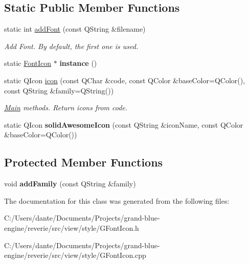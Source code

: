 \subsection*{Static Public Member Functions}
\begin{DoxyCompactItemize}
\item 
\mbox{\label{classrev_1_1_font_icon_aa422a4dac1897e70632f4af132a2d5d1}} 
static int \mbox{\hyperlink{classrev_1_1_font_icon_aa422a4dac1897e70632f4af132a2d5d1}{add\+Font}} (const Q\+String \&filename)
\begin{DoxyCompactList}\small\item\em Add Font. By default, the first one is used. \end{DoxyCompactList}\item 
\mbox{\label{classrev_1_1_font_icon_aa67f5c196bd46217b331924cfb3020da}} 
static \mbox{\hyperlink{classrev_1_1_font_icon}{Font\+Icon}} $\ast$ {\bfseries instance} ()
\item 
\mbox{\label{classrev_1_1_font_icon_a77fbe9901d4d1ccf5c34cd28d2b9e737}} 
static Q\+Icon \mbox{\hyperlink{classrev_1_1_font_icon_a77fbe9901d4d1ccf5c34cd28d2b9e737}{icon}} (const Q\+Char \&code, const Q\+Color \&base\+Color=Q\+Color(), const Q\+String \&family=Q\+String())
\begin{DoxyCompactList}\small\item\em \mbox{\hyperlink{class_main}{Main}} methods. Return icons from code. \end{DoxyCompactList}\item 
\mbox{\label{classrev_1_1_font_icon_a414a4b299d6ce1711035e403294bda6c}} 
static Q\+Icon {\bfseries solid\+Awesome\+Icon} (const Q\+String \&icon\+Name, const Q\+Color \&base\+Color=Q\+Color())
\end{DoxyCompactItemize}
\subsection*{Protected Member Functions}
\begin{DoxyCompactItemize}
\item 
\mbox{\label{classrev_1_1_font_icon_ae1e34e2d69b08b75a74c0d727db8ef26}} 
void {\bfseries add\+Family} (const Q\+String \&family)
\end{DoxyCompactItemize}


The documentation for this class was generated from the following files\+:\begin{DoxyCompactItemize}
\item 
C\+:/\+Users/dante/\+Documents/\+Projects/grand-\/blue-\/engine/reverie/src/view/style/G\+Font\+Icon.\+h\item 
C\+:/\+Users/dante/\+Documents/\+Projects/grand-\/blue-\/engine/reverie/src/view/style/G\+Font\+Icon.\+cpp\end{DoxyCompactItemize}
